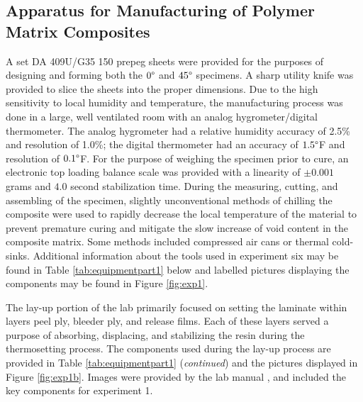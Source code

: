 \subsection{Apparatus for Manufacturing of Polymer Matrix Composites}
A set DA 409U/G35 150 prepeg sheets were provided for the purposes of designing and forming both the $0\degree$ and $45\degree$ specimens.  A sharp utility knife was provided to slice the sheets into the proper dimensions.  Due to the high sensitivity to local humidity and temperature, the manufacturing process was done in a large, well ventilated room with an analog hygrometer/digital thermometer.  The analog hygrometer had a relative humidity accuracy of 2.5\% and resolution of 1.0\%; the digital thermometer had an accuracy of $1.5\degree$F and resolution of $0.1\degree$F.  For the purpose of weighing the specimen prior to cure, an electronic top loading balance scale was provided with a linearity of $\pm 0.001$ grams and $4.0$ second stabilization time.  During the measuring, cutting, and assembling of the specimen, slightly unconventional methods of chilling the composite were used to rapidly decrease the local temperature of the material to prevent premature curing and mitigate the slow increase of void content in the composite matrix.  Some methods included compressed air cans or thermal cold-sinks.  Additional information about the tools used in experiment six may be found in Table \ref{tab:equipmentpart1} below and labelled pictures displaying the components may be found in Figure \ref{fig:exp1}.

The lay-up portion of the lab primarily focused on setting the laminate within layers peel ply, bleeder ply, and release films.  Each of these layers served a purpose of absorbing, displacing, and stabilizing the resin during the thermosetting process.  The components used during the lay-up process are provided in Table \ref{tab:equipmentpart1} (\textit{continued}) and the pictures displayed in Figure \ref{fig:exp1b}.  Images were provided by the lab manual \cite{labmanual}, and included the key components for experiment 1.

